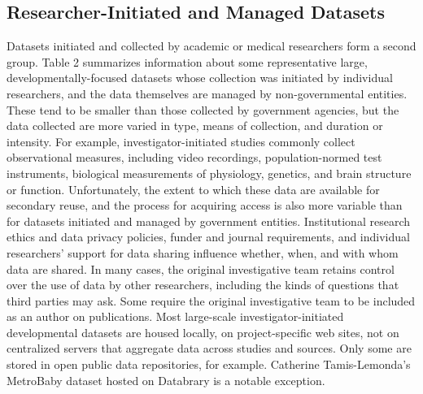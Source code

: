 \documentclass[letterpaper,man,apacite,natbib]{apa6}
\begin{document}
\subsection{Researcher-Initiated and Managed Datasets}
Datasets initiated and collected by academic or medical researchers form a second group.
Table 2 summarizes information about some representative large, developmentally-focused datasets whose collection was initiated by individual researchers, and the data themselves are managed by non-governmental entities.
These tend to be smaller than those collected by government agencies, but the data collected are more varied in type, means of collection, and duration or intensity.
For example, investigator-initiated studies commonly collect observational measures, including video recordings, population-normed test instruments, biological measurements of physiology, genetics, and brain structure or function.
Unfortunately, the extent to which these data are available for secondary reuse, and the process for acquiring access is also more variable than for datasets initiated and managed by government entities.
Institutional research ethics and data privacy policies, funder and journal requirements, and individual researchers' support for data sharing influence whether, when, and with whom data are shared.
In many cases, the original investigative team retains control over the use of data by other researchers, including the kinds of questions that third parties may ask.
Some require the original investigative team to be included as an author on publications.
Most large-scale investigator-initiated developmental datasets are housed locally, on project-specific web sites, not on centralized servers that aggregate data across studies and sources.
Only some are stored in open public data repositories, for example.
Catherine Tamis-Lemonda's MetroBaby dataset \cite{1372d9e6-d07e-4068-8264-7a5c629799c2} hosted on Databrary is a notable exception.
\end{document}
